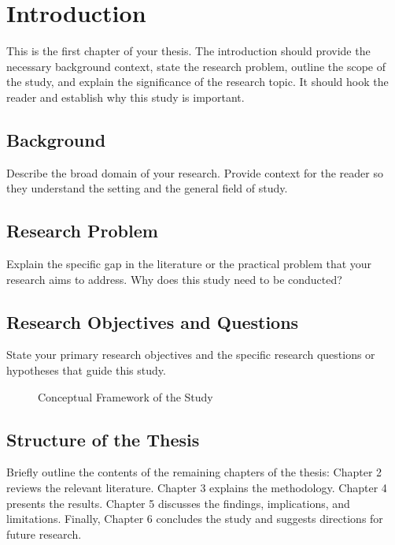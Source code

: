 
\section{Introduction}

This is the first chapter of your thesis. The introduction should provide the necessary background context, state the research problem, outline the scope of the study, and explain the significance of the research topic. It should hook the reader and establish why this study is important.

\subsection{Background}
Describe the broad domain of your research. Provide context for the reader so they understand the setting and the general field of study.

\subsection{Research Problem}
Explain the specific gap in the literature or the practical problem that your research aims to address. Why does this study need to be conducted?

\subsection{Research Objectives and Questions}
State your primary research objectives and the specific research questions or hypotheses that guide this study.

\begin{figure}[htbp]
    \centering
    \caption{Conceptual Framework of the Study}
    \label{fig:conceptual_framework}
\end{figure}

\subsection{Structure of the Thesis}
Briefly outline the contents of the remaining chapters of the thesis: Chapter 2 reviews the relevant literature. Chapter 3 explains the methodology. Chapter 4 presents the results. Chapter 5 discusses the findings, implications, and limitations. Finally, Chapter 6 concludes the study and suggests directions for future research.
